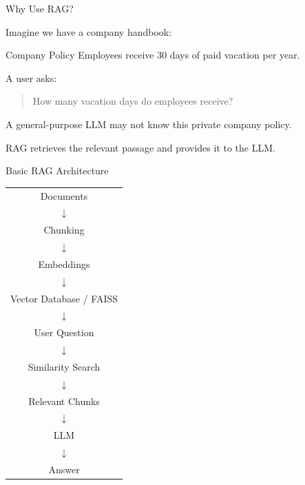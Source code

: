 \documentclass[aspectratio=169]{beamer}
\begin{document}
\begin{frame}{Why Use RAG?}

Imagine we have a company handbook:

\begin{block}{Company Policy}
Employees receive 30 days of paid vacation per year.
\end{block}

A user asks:

\begin{quote}
How many vacation days do employees receive?
\end{quote}

A general-purpose LLM may not know this private company policy.

\vspace{0.3cm}

RAG retrieves the relevant passage and provides it to the LLM.

\end{frame}

\begin{frame}[shrink]{Basic RAG Architecture}

\begin{center}

\begin{tabular}{c}
Documents \\
$\downarrow$ \\
Chunking \\
$\downarrow$ \\
Embeddings \\
$\downarrow$ \\
Vector Database / FAISS \\
$\downarrow$ \\
User Question \\
$\downarrow$ \\
Similarity Search \\
$\downarrow$ \\
Relevant Chunks \\
$\downarrow$ \\
LLM \\
$\downarrow$ \\
Answer
\end{tabular}

\end{center}

\end{frame}
\end{document}
